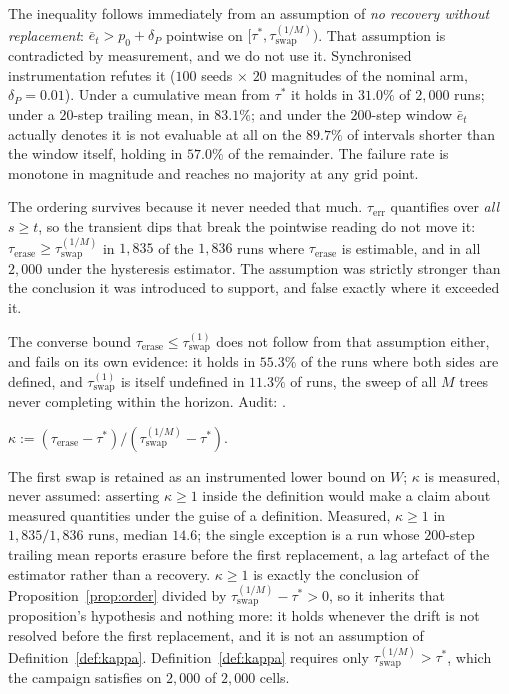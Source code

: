 \begin{remark}\label{rem:order} The inequality follows immediately from an assumption of \emph{no recovery without replacement}: $\bar{e}_t > p_0 + \delta_P$ pointwise on $[\tau^*, \tau_{\mathrm{swap}}^{(1/M)})$. That assumption is contradicted by measurement, and we do not use it. Synchronised instrumentation refutes
  it ($100$ seeds $\times$ $20$ magnitudes of the nominal arm, $\delta_P = 0.01$).
  Under a cumulative mean from $\tau^*$ it holds in $31.0\%$ of $2{,}000$ runs;
  under a $20$-step trailing mean, in $83.1\%$; and under the $200$-step window
  $\bar{e}_t$ actually denotes it is not evaluable at all on the $89.7\%$ of
  intervals shorter than the window itself, holding in $57.0\%$ of the remainder.
  The failure rate is monotone in magnitude and reaches no majority at any grid
  point.

  The ordering survives because it never needed that much. $\tau_{\mathrm{err}}$
  quantifies over \emph{all} $s \ge t$, so the transient dips that break the
  pointwise reading do not move it: $\tau_{\mathrm{erase}} \ge
  \tau_{\mathrm{swap}}^{(1/M)}$ in $1{,}835$ of the $1{,}836$ runs where
  $\tau_{\mathrm{erase}}$ is estimable, and in all $2{,}000$ under the hysteresis
  estimator. The assumption was strictly stronger than the conclusion it was
  introduced to support, and false exactly where it exceeded it.

  The converse bound $\tau_{\mathrm{erase}} \le \tau_{\mathrm{swap}}^{(1)}$ does not follow from that assumption either, and fails on its own evidence: it holds in $55.3\%$ of the runs where both sides
  are defined, and $\tau_{\mathrm{swap}}^{(1)}$ is itself undefined in $11.3\%$ of
  runs, the sweep of all $M$ trees never completing within the horizon. Audit:
  .
\end{remark}

\begin{definition}\label{def:kappa}
  $\kappa := (\tau_{\mathrm{erase}} - \tau^*) /
             (\tau_{\mathrm{swap}}^{(1/M)} - \tau^*)$.
\end{definition}

The first swap is retained as an instrumented lower bound on $W$; $\kappa$ is measured, never assumed: asserting $\kappa \ge 1$ inside the definition would make a claim about measured quantities under the guise of a definition.
Measured, $\kappa \ge 1$ in $1{,}835/1{,}836$ runs, median $14.6$; the single
exception is a run whose $200$-step trailing mean reports erasure before the first
replacement, a lag artefact of the estimator rather than a recovery.
$\kappa \ge 1$ is exactly the conclusion of Proposition~\ref{prop:order} divided
by $\tau_{\mathrm{swap}}^{(1/M)} - \tau^* > 0$, so it inherits that
proposition's hypothesis and nothing more: it holds whenever the drift is not
resolved before the first replacement, and it is not an assumption of
Definition~\ref{def:kappa}. Definition~\ref{def:kappa} requires only
$\tau_{\mathrm{swap}}^{(1/M)} > \tau^*$, which the campaign satisfies on
$2{,}000$ of $2{,}000$ cells.

